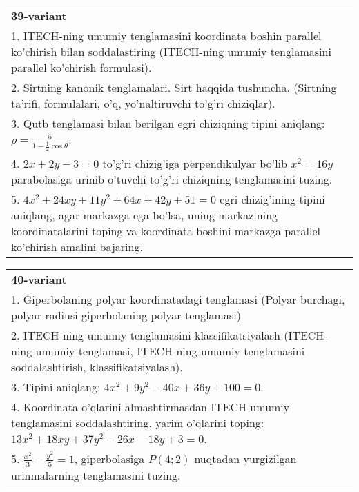 \documentclass{article}
\begin{document}
\begin{tabular}{m{17cm}}
\textbf{39-variant}\\
1. ITECH-ning umumiy tenglamasini koordinata boshin parallel ko'chirish bilan soddalastiring (ITECH-ning umumiy tenglamasini parallel ko'chirish formulasi).\\

2. Sirtning kanonik tenglamalari. Sirt haqqida tushuncha. (Sirtning ta'rifi, formulalari, o'q, yo'naltiruvchi to'g'ri chiziqlar).\\

3. Qutb tenglamasi bilan berilgan egri chiziqning tipini aniqlang: $\rho=\frac{5}{1-\frac{1}{2}\cos\theta}$.\\

4. $2x + 2y - 3 = 0$ to'g'ri chizig'iga perpendikulyar bo'lib $x^{2} = 16y$ parabolasiga urinib o'tuvchi to'g'ri chiziqning tenglamasini tuzing.  \\

5. $4x^{2} + 24xy + 11y^{2} + 64x + 42y + 51 = 0$ egri chizig'ining tipini aniqlang, agar markazga ega bo'lsa, uning markazining koordinatalarini toping va koordinata boshini markazga parallel ko'chirish amalini bajaring.
\end{tabular}
\vspace{1cm}


\begin{tabular}{m{17cm}}
\textbf{40-variant}\\
1. Giperbolaning polyar koordinatadagi tenglamasi (Polyar burchagi, polyar radiusi giperbolaning polyar tenglamasi)\\

2. ITECH-ning umumiy tenglamasini klassifikatsiyalash (ITECH-ning umumiy tenglamasi, ITECH-ning umumiy tenglamasini soddalashtirish, klassifikatsiyalash).\\

3. Tipini aniqlang: $4x^2+9y^2-40x+36y+100=0$.\\

4. Koordinata o'qlarini almashtirmasdan ITECH umumiy tenglamasini soddalashtiring, yarim o'qlarini toping: $13x^{2} + 18xy + 37y^{2} - 26x - 18y + 3 = 0$.  \\

5. $\frac{x^{2}}{3} - \frac{y^{2}}{5} = 1$, giperbolasiga $P(4;2)$ nuqtadan yurgizilgan urinmalarning tenglamasini tuzing.  
\end{tabular}
\vspace{1cm}
\end{document}
